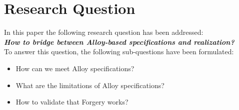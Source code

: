 \documentclass[oneside]{book}
\begin{document}

\newpage

\section{Research Question}

In this paper the following research question has been addressed:\\

\textit{\textbf{How to bridge between Alloy-based specifications and realization?}}\\

To answer this question, the following sub-questions have been formulated:
\begin{itemize}
  \item How can we meet Alloy specifications?
  \item What are the limitations of Alloy specifications?
  \item How to validate that Forgery works?
\end{itemize}
\end{document}
